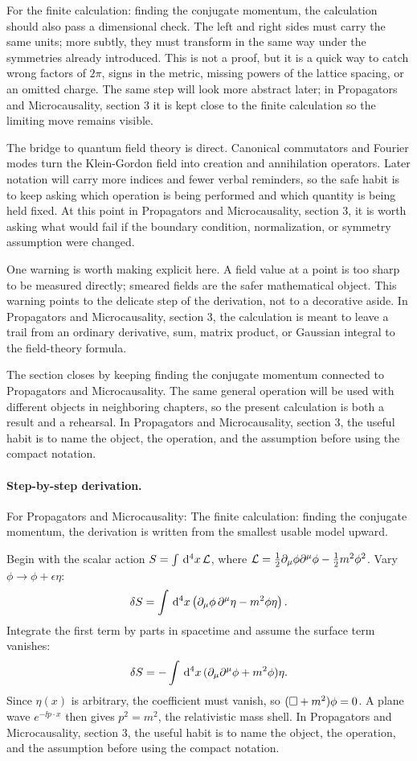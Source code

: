 For the finite calculation: finding the conjugate momentum, the calculation should also pass a dimensional check.  The left and right sides must carry the same units; more subtly, they must transform in the same way under the symmetries already introduced.  This is not a proof, but it is a quick way to catch wrong factors of \(2\pi\), signs in the metric, missing powers of the lattice spacing, or an omitted charge.  The same step will look more abstract later; in Propagators and Microcausality, section 3 it is kept close to the finite calculation so the limiting move remains visible.

The bridge to quantum field theory is direct.  Canonical commutators and Fourier modes turn the Klein-Gordon field into creation and annihilation operators.  Later notation will carry more indices and fewer verbal reminders, so the safe habit is to keep asking which operation is being performed and which quantity is being held fixed.  At this point in Propagators and Microcausality, section 3, it is worth asking what would fail if the boundary condition, normalization, or symmetry assumption were changed.

One warning is worth making explicit here.  A field value at a point is too sharp to be measured directly; smeared fields are the safer mathematical object.  This warning points to the delicate step of the derivation, not to a decorative aside.  In Propagators and Microcausality, section 3, the calculation is meant to leave a trail from an ordinary derivative, sum, matrix product, or Gaussian integral to the field-theory formula.

The section closes by keeping finding the conjugate momentum connected to Propagators and Microcausality.  The same general operation will be used with different objects in neighboring chapters, so the present calculation is both a result and a rehearsal.  In Propagators and Microcausality, section 3, the useful habit is to name the object, the operation, and the assumption before using the compact notation.



\paragraph{Step-by-step derivation.}

For Propagators and Microcausality: The finite calculation: finding the conjugate momentum, the derivation is written from the smallest usable model upward.

Begin with the scalar action \(S=\int\,\mathrm d^4x\,\mathcal L\), where \(\mathcal L=\frac12\partial_\mu\phi\partial^\mu\phi-\frac12m^2\phi^2\).  Vary \(\phi\to\phi+\epsilon\eta\):
\[
  \delta S=\int\,\mathrm d^4x\left(\partial_\mu\phi\,\partial^\mu\eta-m^2\phi\eta\right).
\]
Integrate the first term by parts in spacetime and assume the surface term vanishes:
\[
  \delta S=-\int\,\mathrm d^4x\,(\partial_\mu\partial^\mu\phi+m^2\phi)\eta.
\]
Since \(\eta(x)\) is arbitrary, the coefficient must vanish, so \((\Box+m^2)\phi=0\).  A plane wave \(e^{-\ii p\cdot x}\) then gives \(p^2=m^2\), the relativistic mass shell.  In Propagators and Microcausality, section 3, the useful habit is to name the object, the operation, and the assumption before using the compact notation.

